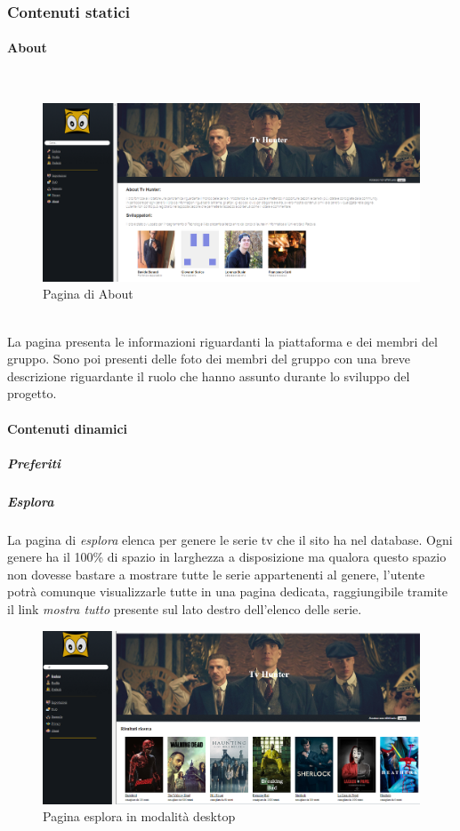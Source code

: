 \subsubsection{Contenuti statici}

\paragraph{About} 
~\\	

\begin{figure}[h!]
	\centerline{\includegraphics[scale=0.4]{img/about.png}}
	\caption{Pagina di About}
	\label{fig:addForm}
\end{figure}	

~\\	
La pagina presenta le informazioni riguardanti la piattaforma e dei membri del gruppo. Sono poi presenti delle foto dei membri del gruppo con una breve descrizione riguardante il ruolo che hanno assunto durante lo sviluppo del progetto. 


\paragraph{Contenuti dinamici}   

\subparagraph{Preferiti}

\subparagraph{Esplora}
La pagina di \textit{esplora} elenca per genere le serie tv che il sito ha nel database. Ogni genere ha il 100\% di spazio in larghezza a disposizione ma qualora questo spazio non dovesse bastare a mostrare tutte le serie appartenenti al genere, l'utente potrà comunque visualizzarle tutte in una pagina dedicata, raggiungibile tramite il link \textit{mostra tutto} presente sul lato destro dell'elenco delle serie.

\begin{figure}[H]
	\centerline{\includegraphics[scale=0.33]{img/esplora.png}}
	\caption{Pagina esplora in modalità desktop}
	\label{fig:addForm}
\end{figure}	

